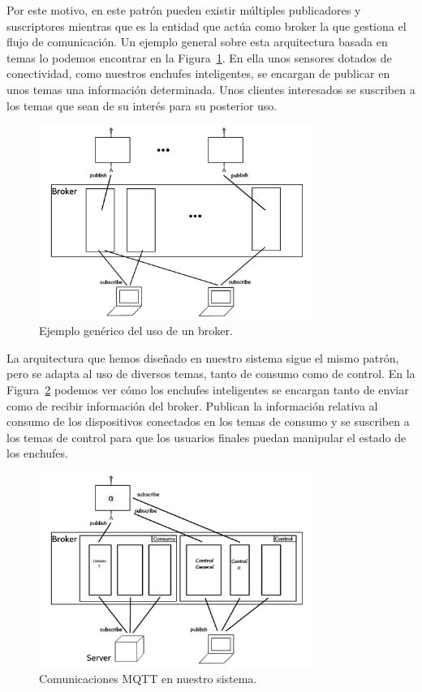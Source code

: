\documentclass[a4paper,10pt]{article}
\begin{document}
Por este motivo, en este patrón pueden existir múltiples publicadores
y suscriptores mientras que es la entidad que actúa como broker la que
gestiona el flujo de comunicación. Un ejemplo general sobre esta
arquitectura basada en temas lo podemos encontrar en la
Figura~\ref{fig:arquitectura_pub_sub}. En ella unos sensores dotados
de conectividad, como nuestros enchufes inteligentes, se encargan de
publicar en unos temas una información determinada. Unos clientes
interesados se suscriben a los temas que sean de su interés para su
posterior uso.

\begin{figure}[H]
  \centering
  \includegraphics[width=0.8\textwidth]{img/arquitectura_pub_sub_ejemplo.png}
  \caption{Ejemplo genérico del uso de un broker.}\label{fig:arquitectura_pub_sub}
\end{figure}

La arquitectura que hemos diseñado en nuestro sistema sigue el mismo
patrón, pero se adapta al uso de diversos temas, tanto de consumo como
de control. En la Figura~\ref{fig:arquitectura_broker_sistema} podemos
ver cómo los enchufes inteligentes se encargan tanto de enviar como de
recibir información del broker. Publican la información relativa al
consumo de los dispositivos conectados en los temas de consumo y se
suscriben a los temas de control para que los usuarios finales puedan
manipular el estado de los enchufes.

\begin{figure}[H]
  \centering
  \includegraphics[width=0.8\textwidth]{img/arquitectura_broker_sistema.png}
  \caption{Comunicaciones MQTT en nuestro sistema.}\label{fig:arquitectura_broker_sistema}
\end{figure}
\end{document}

